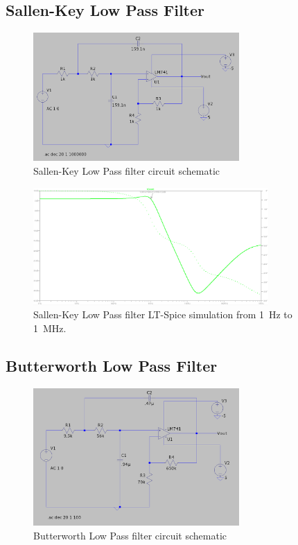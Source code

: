 \documentclass[CMPE]{../KGCOEReport}
\begin{document}
	\pagebreak

	\subsection*{Sallen-Key Low Pass Filter}
	\begin{figure}[ht]
		\centering
		\includegraphics[width=0.7\textwidth]{sallen_key_schem}
		\caption{Sallen-Key Low Pass filter circuit schematic}
		\label{fig:sallen_key_schem}
	\end{figure}

	\begin{figure}[ht]
		\centering
		\includegraphics[width=0.8\textwidth]{sallen_key}
		\caption{Sallen-Key Low Pass filter LT-Spice simulation from \SI{1}{\Hz} to \SI{1}{\mega\Hz}.}
		\label{fig:sallen_key}
	\end{figure}

	\pagebreak

	\subsection*{Butterworth Low Pass Filter}
	\begin{figure}[ht]
		\centering
		\includegraphics[width=0.7\textwidth]{butterworth_schem}
		\caption{Butterworth Low Pass filter circuit schematic}
		\label{fig:butterworth_schem}
	\end{figure}
\end{document}
